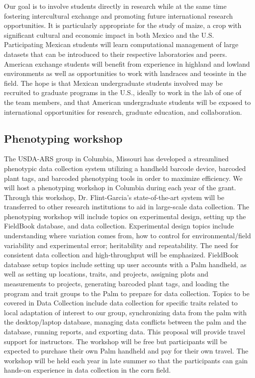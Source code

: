 Our goal is to involve students directly in research while at the same time fostering intercultural exchange and promoting future international research opportunities. It is particularly appropriate for the study of maize, a crop with significant cultural and economic impact in both Mexico and the U.S. Participating Mexican students will learn computational management of large datasets that can be introduced to their respective laboratories and peers. American exchange students will benefit from experience in highland and lowland environments as well as opportunities to work with landraces and teosinte in the field.  The hope is that Mexican undergraduate students involved may be recruited to graduate programs in the U.S., ideally to work in the lab of one of the team members, and that American undergraduate students will be exposed to international opportunities for research, graduate education, and collaboration.

\subsection*{Phenotyping workshop} %

The USDA-ARS group in Columbia, Missouri has developed a streamlined phenotypic data collection system utilizing a handheld barcode device, barcoded plant tags, and barcoded phenotyping tools in order to maximize efficiency.  We will host a phenotyping workshop in Columbia during each year of the grant.  Through this workshop, Dr. Flint-Garcia's state-of-the-art system will be transferred to other research institutions to aid in large-scale data collection. The phenotyping workshop will include topics on experimental design, setting up the FieldBook database, and data collection.  Experimental design topics include understanding where variation comes from, how to control for environmental/field variability and experimental error; heritability and repeatability.  The need for consistent data collection and high-throughput will be emphasized.  FieldBook database setup topics include setting up user accounts with a Palm handheld, as well as setting up locations, traits, and projects, assigning plots and measurements to projects,  generating barcoded plant tags, and loading the program and trait groups to the Palm to prepare for data collection.  Topics to be covered in Data Collection include data collection for specific traits related to local adaptation of interest to our group, synchronizing data from the palm with the desktop/laptop database, managing data conflicts between the palm and the database, running reports, and exporting data.  This proposal will provide travel support for instructors.  The workshop will be free but participants will be expected to purchase their own Palm handheld and pay for their own travel.  The workshop will be held each year in late summer so that the participants can gain hands-on experience in data collection in the corn field.

